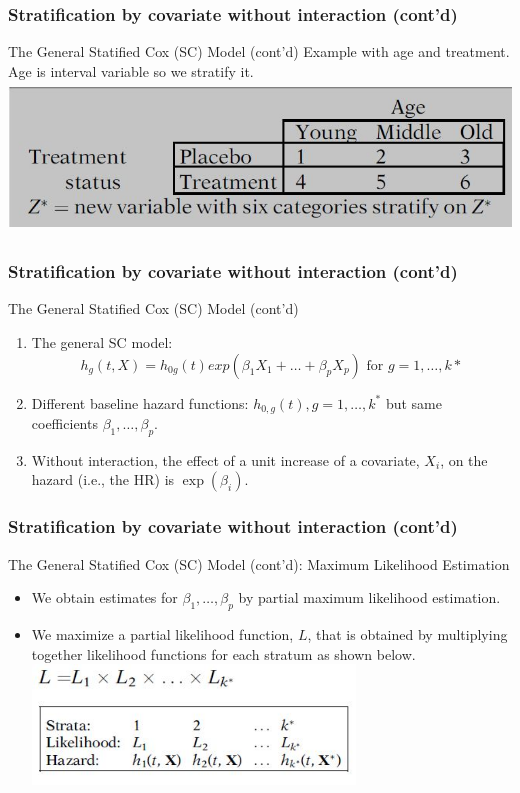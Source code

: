 \documentclass{beamer}
\theoremstyle{definition}
\begin{document}
\begin{frame}
\frametitle{Stratification by covariate without interaction (cont'd)}
\begin{block}{The General Statified Cox (SC) Model (cont'd)}
Example with age and treatment. Age is interval variable so we stratify it.
   \includegraphics[width =\textwidth, height=4cm]{CH5_exampleSC}
\end{block}
\end{frame}

\begin{frame}
\frametitle{Stratification by covariate without interaction (cont'd)}
\begin{block}{The General Statified Cox (SC) Model (cont'd)}
\begin{enumerate}
\item The general SC model:
\[
h_g(t,X) = h_{0g}(t)exp(\beta_1 X_1 + \ldots + \beta_p X_p) \text{ for }  g=1,\ldots,k*
\]
\item Different baseline hazard functions: $h_{0,g}(t), g=1,\ldots,k^*$ but same coefficients $\beta_1, \ldots, \beta_p$.
\item Without interaction, the effect of a unit increase of a covariate, $X_i$, on the hazard (i.e., the HR) is $\exp(\beta_i)$.
\end{enumerate}
\end{block}
\end{frame}

\begin{frame}
\frametitle{Stratification by covariate without interaction (cont'd)}
\begin{block}{The General Statified Cox (SC) Model (cont'd): Maximum Likelihood Estimation}
\begin{itemize}
\item We obtain estimates for $\beta_1,\ldots,\beta_p$ by partial maximum likelihood estimation.
\item We maximize a partial likelihood function, $L$, that is obtained by multiplying together likelihood functions for each
stratum as shown below.
\vspace{10pt}
\includegraphics[width =\textwidth, height=3.2cm]{CH5_Partiallike}
\end{itemize}
\end{block}
\end{frame}
\end{document}

